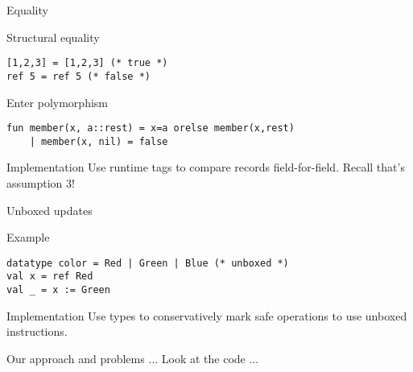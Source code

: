 \documentclass[presentation]{beamer}
\begin{document}
\begin{frame}[fragile,label=Equality]{Equality}
  \begin{block}{Structural equality}
\begin{verbatim}
[1,2,3] = [1,2,3] (* true *)
ref 5 = ref 5 (* false *)
\end{verbatim}
  \end{block}
  \pause
  \begin{block}{Enter polymorphism}
\begin{verbatim}
fun member(x, a::rest) = x=a orelse member(x,rest)
    | member(x, nil) = false
\end{verbatim}
  \end{block}
  \pause
  \begin{block}{Implementation}
    Use runtime tags to compare records field-for-field.
    Recall that's assumption 3!
  \end{block}
\end{frame}

\begin{frame}[fragile]{Unboxed updates}
  \begin{block}{Example}
\begin{verbatim}
datatype color = Red | Green | Blue (* unboxed *)
val x = ref Red
val _ = x := Green
\end{verbatim}
  \end{block}
  \pause
  \begin{block}{Implementation}
    Use types to conservatively mark safe operations to use unboxed instructions.
  \end{block}
\end{frame}

\begin{frame}[fragile]{Our approach and problems}
  $\ldots$ Look at the code $\ldots$
\end{frame}
\end{document}

